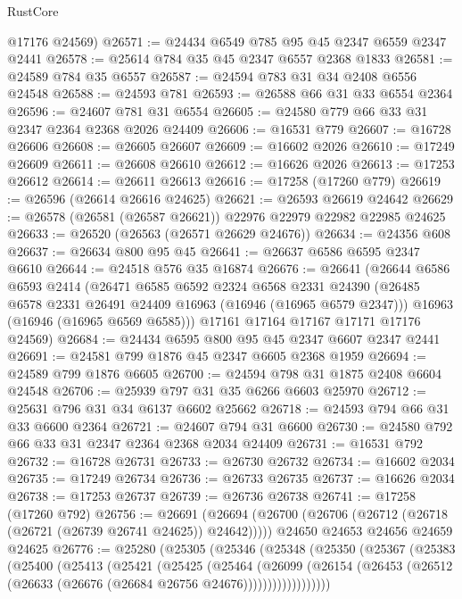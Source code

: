 \begin{lexlean}{RustCore}
\begin{coremodule}
      @17176
      @24569)
@26571 := @24434 @6549 @785 @95 @45 @2347 @6559 @2347 @2441
@26578 := @25614 @784 @35 @45 @2347 @6557 @2368 @1833
@26581 := @24589 @784 @35 @6557
@26587 := @24594 @783 @31 @34 @2408 @6556 @24548
@26588 := @24593 @781
@26593 := @26588 @66 @31 @33 @6554 @2364
@26596 := @24607 @781 @31 @6554
@26605 := @24580 @779 @66 @33 @31 @2347 @2364 @2368 @2026 @24409
@26606 := @16531 @779
@26607 := @16728 @26606
@26608 := @26605 @26607
@26609 := @16602 @2026
@26610 := @17249 @26609
@26611 := @26608 @26610
@26612 := @16626 @2026
@26613 := @17253 @26612
@26614 := @26611 @26613
@26616 := @17258 (@17260 @779)
@26619 := @26596 (@26614 @26616 @24625)
@26621 := @26593 @26619 @24642
@26629 := @26578 (@26581 (@26587 @26621)) @22976 @22979 @22982 @22985 @24625
@26633 := @26520 (@26563 (@26571 @26629 @24676))
@26634 := @24356 @608
@26637 := @26634 @800 @95 @45
@26641 := @26637 @6586 @6595 @2347 @6610
@26644 := @24518 @576 @35 @16874
@26676 := @26641
    (@26644
      @6586
      @6593
      @2414
      (@26471
        @6585
        @6592
        @2324
        @6568
        @2331
        @24390
        (@26485 @6578 @2331 @26491 @24409 @16963 (@16946 (@16965 @6579 @2347)))
        @16963
        (@16946 (@16965 @6569 @6585)))
      @17161
      @17164
      @17167
      @17171
      @17176
      @24569)
@26684 := @24434 @6595 @800 @95 @45 @2347 @6607 @2347 @2441
@26691 := @24581 @799 @1876 @45 @2347 @6605 @2368 @1959
@26694 := @24589 @799 @1876 @6605
@26700 := @24594 @798 @31 @1875 @2408 @6604 @24548
@26706 := @25939 @797 @31 @35 @6266 @6603 @25970
@26712 := @25631 @796 @31 @34 @6137 @6602 @25662
@26718 := @24593 @794 @66 @31 @33 @6600 @2364
@26721 := @24607 @794 @31 @6600
@26730 := @24580 @792 @66 @33 @31 @2347 @2364 @2368 @2034 @24409
@26731 := @16531 @792
@26732 := @16728 @26731
@26733 := @26730 @26732
@26734 := @16602 @2034
@26735 := @17249 @26734
@26736 := @26733 @26735
@26737 := @16626 @2034
@26738 := @17253 @26737
@26739 := @26736 @26738
@26741 := @17258 (@17260 @792)
@26756 := @26691
    (@26694 (@26700 (@26706 (@26712 (@26718 (@26721 (@26739 @26741 @24625)) @24642)))))
    @24650
    @24653
    @24656
    @24659
    @24625
@26776 := @25280
    (@25305
      (@25346
        (@25348
          (@25350
            (@25367
              (@25383
                (@25400
                  (@25413
                    (@25421
                      (@25425
                        (@25464
                          (@26099
                            (@26154
                              (@26453
                                (@26512 (@26633 (@26676 (@26684 @26756 @24676))))))))))))))))))

\end{coremodule}
\end{lexlean}
